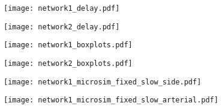 \begin{figure*}[t!]
%
\centering
%
%
\vspace{-5mm}
\begin{subfigure}{0.49\textwidth}
\texttt{[image: network1\_delay.pdf]}
 \label{fig:arterial:delayCurve}
\end{subfigure}
\begin{subfigure}{0.49\textwidth}
\texttt{[image: network2\_delay.pdf]}
 \label{fig:grid:delayCurve}
\end{subfigure}
\begin{subfigure}{0.49\textwidth}
\texttt{[image: network1\_boxplots.pdf]}
 \label{fig:arterial:boxplot}
\end{subfigure}
\begin{subfigure}{0.49\textwidth}
\texttt{[image: network2\_boxplots.pdf]}
 \label{fig:grid:boxplot}
\end{subfigure}
\begin{subfigure}{0.49\textwidth}
  \centering
\end{subfigure}
\begin{subfigure}{0.49\textwidth}
  \centering
\end{subfigure}
%
\begin{subfigure}{0.49\textwidth}
\texttt{[image: network1\_microsim\_fixed\_slow\_side.pdf]}
 \label{fig:microsim1:fixed:side}
\end{subfigure}
\begin{subfigure}{0.49\textwidth}
\texttt{[image: network1\_microsim\_fixed\_slow\_arterial.pdf]}
 \label{fig:microsim1:fixed:arterial}
\end{subfigure}



\end{figure*}
